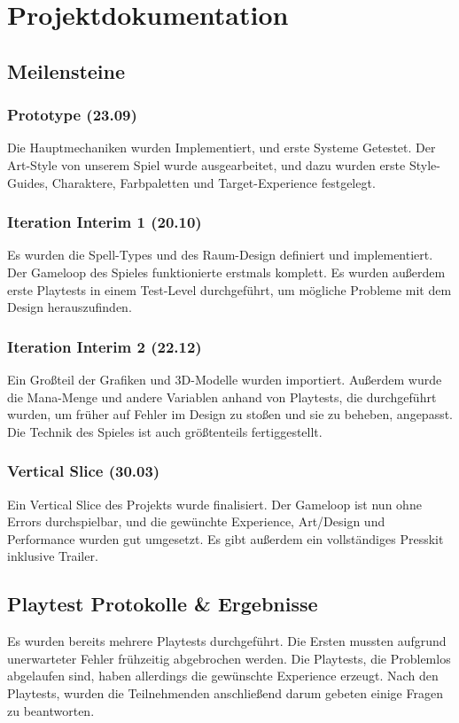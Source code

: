\chapter{Projektdokumentation}

\section{Meilensteine}

\subsection{Prototype (23.09)}
Die Hauptmechaniken wurden Implementiert, und erste Systeme Getestet. Der Art-Style von unserem Spiel wurde ausgearbeitet, und dazu wurden erste Style-Guides, Charaktere, Farbpaletten und Target-Experience festgelegt.

\subsection{Iteration Interim 1 (20.10)}
Es wurden die Spell-Types und des Raum-Design definiert und implementiert. Der Gameloop des Spieles funktionierte erstmals komplett. Es wurden außerdem erste Playtests in einem Test-Level durchgeführt, um mögliche Probleme mit dem Design herauszufinden.

\subsection{Iteration Interim 2 (22.12)}
Ein Großteil der Grafiken und 3D-Modelle wurden importiert. Außerdem wurde die Mana-Menge und andere Variablen anhand von Playtests, die durchgeführt wurden, um früher auf Fehler im Design zu stoßen und sie zu beheben, angepasst. Die Technik des Spieles ist auch größtenteils fertiggestellt.

\subsection{Vertical Slice (30.03)}
Ein Vertical Slice des Projekts wurde finalisiert. Der Gameloop ist nun ohne Errors durchspielbar, und die gewünchte Experience, Art/Design und Performance wurden gut umgesetzt. Es gibt außerdem ein vollständiges Presskit inklusive Trailer.

\section{Playtest Protokolle \& Ergebnisse}
Es wurden bereits mehrere Playtests durchgeführt. Die Ersten mussten aufgrund unerwarteter Fehler frühzeitig abgebrochen werden. Die Playtests, die Problemlos abgelaufen sind, haben allerdings die gewünschte Experience erzeugt. Nach den Playtests, wurden die Teilnehmenden anschließend darum gebeten einige Fragen zu beantworten.

